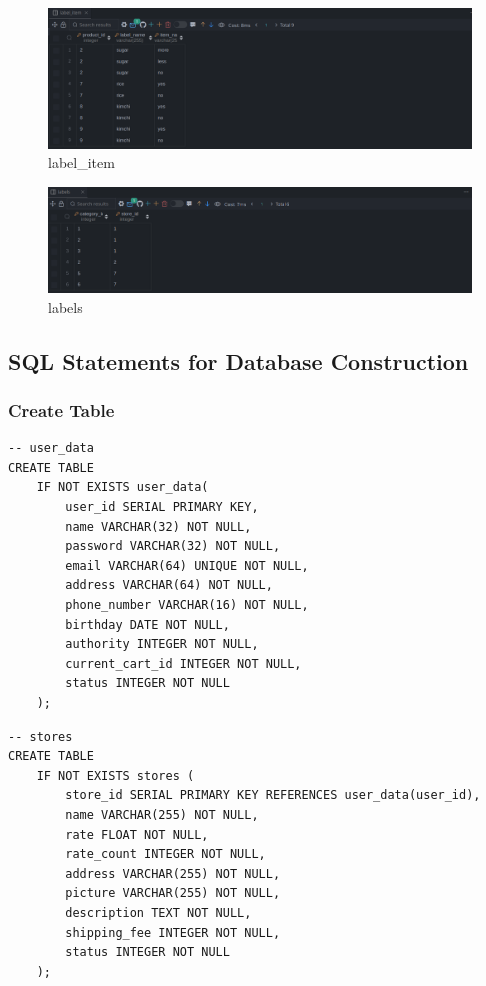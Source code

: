 \documentclass[a4paper, 12pt]{article}
\begin{document}
\begin{figure}[hp]
    \centerline{\includegraphics[width=\linewidth]{snapshot/label_item.png}}
    \caption{label_item}
\end{figure}

\clearpage

\begin{figure}[h!]
    \centerline{\includegraphics[width=\linewidth]{snapshot/labels.png}}
    \caption{labels}
\end{figure}

\clearpage

\subsection{SQL Statements for Database Construction}
\subsubsection{Create Table}
\begin{lstlisting}
-- user_data
CREATE TABLE
    IF NOT EXISTS user_data(
        user_id SERIAL PRIMARY KEY,
        name VARCHAR(32) NOT NULL,
        password VARCHAR(32) NOT NULL,
        email VARCHAR(64) UNIQUE NOT NULL,
        address VARCHAR(64) NOT NULL,
        phone_number VARCHAR(16) NOT NULL,
        birthday DATE NOT NULL,
        authority INTEGER NOT NULL,
        current_cart_id INTEGER NOT NULL,
        status INTEGER NOT NULL
    );
\end{lstlisting}

\begin{lstlisting}
-- stores
CREATE TABLE
    IF NOT EXISTS stores (
        store_id SERIAL PRIMARY KEY REFERENCES user_data(user_id),
        name VARCHAR(255) NOT NULL,
        rate FLOAT NOT NULL,
        rate_count INTEGER NOT NULL,
        address VARCHAR(255) NOT NULL,
        picture VARCHAR(255) NOT NULL,
        description TEXT NOT NULL,
        shipping_fee INTEGER NOT NULL,
        status INTEGER NOT NULL
    );
\end{lstlisting}
\end{document}
